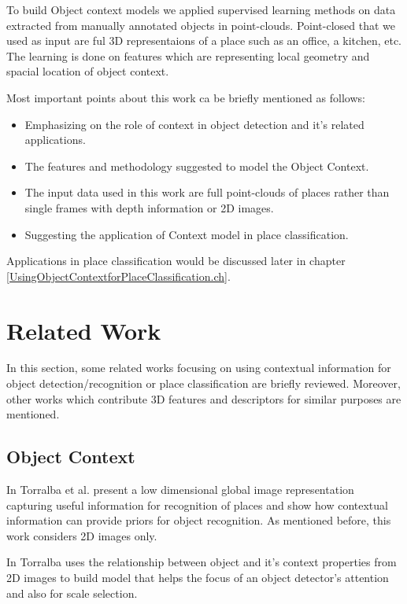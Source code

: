  To build Object context models we applied supervised learning methods on data extracted from manually annotated objects in 
 point-clouds. Point-closed that we used as input are ful 3D representaions of a place such as an office, a kitchen, etc. 
 The learning  is done on features which are representing local geometry and spacial location of object context.
 
 Most important points about this work ca be briefly mentioned as follows:
 
 \begin{itemize}
  \item Emphasizing on the role of context in object detection and it's related applications.
  \item The features and methodology suggested to model the Object Context.
  \item The input data used in this work are full point-clouds of places rather than single frames with depth information or 
  2D images.
  \item Suggesting the application of Context model in place classification.
  
 \end{itemize}

 
Applications in place classification would be discussed later in chapter \ref{UsingObjectContextforPlaceClassification.ch}.

\section {Related Work}
\label{RelatedWork.sec}
     In this section, some related works focusing on using contextual information for object detection/recognition 
     or place classification are briefly reviewed. 
     Moreover, other works which contribute 3D features and descriptors for similar purposes are mentioned.
     
\subsection*{Object Context}
     In \cite{TrollbaContexBased} Torralba et al. present a low dimensional global image representation
     capturing useful information for recognition of places and show how contextual information can provide priors for object
     recognition. 
     As mentioned before, this work considers 2D images only. 
     
     In \cite{TorralbaContextualPriming} Torralba uses the relationship between object and it's context properties from 
     2D images to build model that helps the focus of an object detector's attention and also for scale selection. 
      
